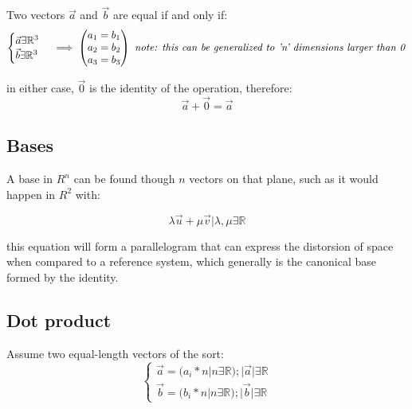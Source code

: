 \documentclass[11pt,fleqn]{book} %
\begin{document}
Two vectors $ \vec{a} $ and $ \vec{b} $ are equal if and only if:
\begin{equation}
    \begin{cases}
        \vec{a} \exists \mathbb{R}^3 \\
        \vec{b} \exists \mathbb{R}^3
    \end{cases}
    \implies
    \begin{pmatrix}
        a_1 = b_1\\
        a_2 = b_2\\
        a_3 = b_3\\
    \end{pmatrix}
    \text{
        \textit{note: this can be generalized to 'n' dimensions larger than 0}}
\end{equation}

in either case,  $ \vec{0} $ is the identity of the operation, therefore:
\begin{equation}
    \vec{a} + \vec{0} = \vec{a}
\end{equation}


\subsection{Bases}

A base in $ R^n $ can be found though $ n $ vectors on that plane, such as it 
would happen in $ R^2 $ with:

\begin{equation}
    \lambda \vec{u} + \mu \vec{v}| \lambda , \mu \exists \mathbb{R}
\end{equation}

this equation will form a parallelogram that can express the distorsion of space when
compared to a reference system, which generally is the canonical base formed by the identity.

\subsection{Dot product}
Assume two equal-length vectors of the sort:
\begin{equation}
    \begin{cases}
       \vec{a} = (a_i * n | n \exists \mathbb{R}); |\vec{a}| \exists \mathbb{R}  \\
       \vec{b} = (b_i * n | n \exists \mathbb{R}); |\vec{b}| \exists \mathbb{R} 
    \end{cases}
\end{equation}
\end{document}
